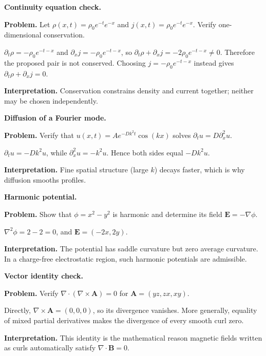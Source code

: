 \begin{workedexample}
\textbf{Continuity equation check.}\par
\textbf{Problem.} Let $\rho(x,t)=\rho_0e^{-t}e^{-x}$ and $j(x,t)=\rho_0e^{-t}e^{-x}$. Verify one-dimensional conservation.
\begin{solution}
$\partial_t\rho=-\rho_0e^{-t-x}$ and $\partial_xj=-\rho_0e^{-t-x}$, so $\partial_t\rho+\partial_xj=-2\rho_0e^{-t-x}\ne0$. Therefore the proposed pair is not conserved. Choosing $j=-\rho_0e^{-t-x}$ instead gives $\partial_t\rho+\partial_xj=0$.

\textbf{Interpretation.} Conservation constrains density and current together; neither may be chosen independently.
\end{solution}
\end{workedexample}

\begin{workedexample}
\textbf{Diffusion of a Fourier mode.}\par
\textbf{Problem.} Verify that $u(x,t)=A e^{-Dk^2t}\cos(kx)$ solves $\partial_tu=D\partial_x^2u$.
\begin{solution}
$\partial_tu=-Dk^2u$, while $\partial_x^2u=-k^2u$. Hence both sides equal $-Dk^2u$.

\textbf{Interpretation.} Fine spatial structure (large $k$) decays faster, which is why diffusion smooths profiles.
\end{solution}
\end{workedexample}

\begin{workedexample}
\textbf{Harmonic potential.}\par
\textbf{Problem.} Show that $\phi=x^2-y^2$ is harmonic and determine its field $\mathbf E=-\nabla\phi$.
\begin{solution}
$\nabla^2\phi=2-2=0$, and $\mathbf E=(-2x,2y)$.

\textbf{Interpretation.} The potential has saddle curvature but zero average curvature. In a charge-free electrostatic region, such harmonic potentials are admissible.
\end{solution}
\end{workedexample}

\begin{workedexample}
\textbf{Vector identity check.}\par
\textbf{Problem.} Verify $\nabla\cdot(\nabla\times\mathbf A)=0$ for $\mathbf A=(yz,zx,xy)$.
\begin{solution}
Directly, $\nabla\times\mathbf A=(0,0,0)$, so its divergence vanishes. More generally, equality of mixed partial derivatives makes the divergence of every smooth curl zero.

\textbf{Interpretation.} This identity is the mathematical reason magnetic fields written as curls automatically satisfy $\nabla\cdot\mathbf B=0$.
\end{solution}
\end{workedexample}

